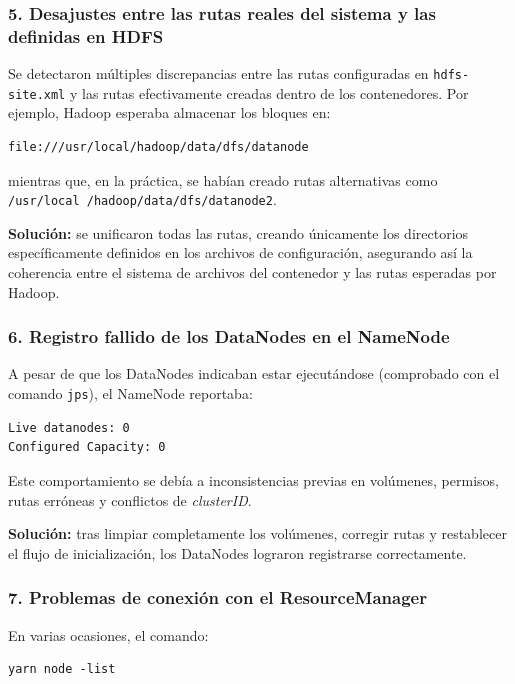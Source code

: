 \subsubsection*{5. Desajustes entre las rutas reales del sistema y las definidas en HDFS}

Se detectaron múltiples discrepancias entre las rutas configuradas en \texttt{hdfs-site.xml} y las rutas efectivamente creadas dentro de los contenedores. Por ejemplo, Hadoop esperaba almacenar los bloques en:

\begin{verbatim}
file:///usr/local/hadoop/data/dfs/datanode
\end{verbatim}

mientras que, en la práctica, se habían creado rutas alternativas como \texttt{/usr/local
/hadoop/data/dfs/datanode2}.

\textbf{Solución:} se unificaron todas las rutas, creando únicamente los directorios específicamente definidos en los archivos de configuración, asegurando así la coherencia entre el sistema de archivos del contenedor y las rutas esperadas por Hadoop.

\subsubsection*{6. Registro fallido de los DataNodes en el NameNode}

A pesar de que los DataNodes indicaban estar ejecutándose (comprobado con el comando \texttt{jps}), el NameNode reportaba:

\begin{verbatim}
Live datanodes: 0
Configured Capacity: 0
\end{verbatim}

Este comportamiento se debía a inconsistencias previas en volúmenes, permisos, rutas erróneas y conflictos de \textit{clusterID}.

\textbf{Solución:} tras limpiar completamente los volúmenes, corregir rutas y restablecer el flujo de inicialización, los DataNodes lograron registrarse correctamente.

\subsubsection*{7. Problemas de conexión con el ResourceManager}

En varias ocasiones, el comando:

\begin{verbatim}
yarn node -list
\end{verbatim}

